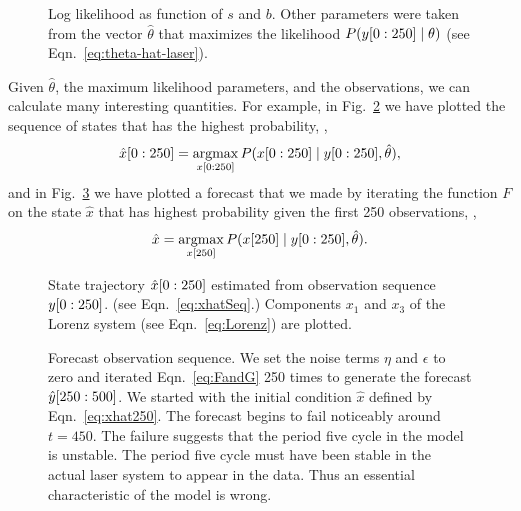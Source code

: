 \begin{figure}[htbp]
  \caption[Log likelihood as function of $s$ and $b$.]%
  {Log likelihood as function of $s$ and $b$.  Other parameters were
    taken from the vector $\hat \theta$ that maximizes the likelihood
    $P(y[0:250]\mid \theta)$ (see Eqn.~\eqref{eq:theta-hat-laser}).}
  \label{fig:LaserLogLike}
\end{figure}

Given $\hat \theta$, the maximum likelihood parameters, and the
observations, we can calculate many interesting quantities.  For
example, in Fig.~\ref{fig:LaserStates} we have plotted the sequence of
states that has the highest probability, \ie,
\begin{equation}
  \label{eq:xhatSeq}
  \hat x[0:250] = \operatorname*{argmax}_{x[0:250]}
  P(x[0:250]\mid y[0:250],\hat \theta),
\end{equation}
and in Fig.~\ref{fig:LaserForecast} we have plotted a forecast that we
made by iterating the function $F$ on the state $\hat x$ that has
highest probability given the first 250 observations, \ie,
\begin{equation}
  \label{eq:xhat250}
  \hat x = \operatorname*{argmax}_{{x}{[250]}} P({x}{[250]}\mid y[0:250],\hat \theta).
\end{equation}

\begin{figure}[htbp]
  \caption[State trajectory $\ts{\hat x}{0}{250}$.]%
  {State trajectory $\ts{\hat x}{0}{250}$ estimated from
    observation sequence $y[0:250]$. (see
    Eqn.~\eqref{eq:xhatSeq}.)  Components $x_1$ and $x_3$ of the
    Lorenz system (see Eqn.~\eqref{eq:Lorenz}) are plotted.}
  \label{fig:LaserStates}
\end{figure}

\begin{figure}[htbp]
  \caption[Forecast observation
  sequence.]%
  {Forecast observation sequence.  We set the noise terms $\eta$ and
    $\epsilon$ to zero and iterated Eqn.~\eqref{eq:FandG} 250 times to
    generate the forecast $\hat y[250:500]$.  We started with
    the initial condition $\hat x$ defined by Eqn.~\eqref{eq:xhat250}.
    The forecast begins to fail noticeably around $t=450$.  The failure
    suggests that the period five cycle in the model is unstable.  The
    period five cycle must have been stable in the actual laser system
    to appear in the data.  Thus an essential characteristic of the
    model is wrong.}
  \label{fig:LaserForecast}
\end{figure}


